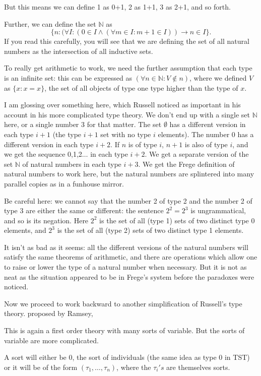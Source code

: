 \documentclass[12pt]{article}
\begin{document}
But this means we can define 1 as 0+1, 2 as 1+1, 3 as 2+1, and so forth.

Further, we can define the set $\mathbb N$ as $$\{n:(\forall I: (0 \in I \wedge (\forall m \in I:m+1 \in I)) \rightarrow n \in I\}.$$  If you read this carefully, you will see that we are defining
the set of all natural numbers as the intersection of all inductive sets.

To really get arithmetic to work, we need the further assumption that each type is an infinite set:  this can be expressed as $(\forall n \in {\mathbb N}:V \not\in  n)$, where we
defined $V$ as $\{x :x=x\}$, the set of all objects of type one type higher than the type of $x$.

I am glossing over something here, which Russell noticed as important in his account in his more complicated type theory.  We don't end up with a single set $\mathbb N$ here,
or a single number 3 for that matter.  The set $\emptyset$ has a different version in each type $i+1$ (the type $i+1$ set with no type $i$ elements).  The number 0 has a different version in each type $i+2$.  If $n$ is of type $i$, $n+1$ is also of type $i$, and we get the sequence 0,1,2$\ldots$ in each type $i+2$.  We get a separate version of the set $\mathbb N$ of natural numbers in each type $i+3$.  We get the Frege definition of natural numbers to work here, but the natural numbers are splintered into many parallel copies as in a funhouse mirror.

Be careful here:  we cannot say that the number 2 of type 2 and the number 2 of type 3 are either the same or different:  the sentence $2^2 = 2^3$ is ungrammatical,
and so is its negation.  Here $2^2$ is the set of all (type 1) sets of two distinct type 0 elements, and $2^3$ is the set of all (type 2) sets of two distinct type 1 elements.

It isn't as bad as it seems:  all the different versions of the natural numbers will satisfy the same theorems of arithmetic, and there are operations which allow one to raise or lower the
type of a natural number when necessary.  But it is not as neat as the situation appeared to be in Frege's system before the paradoxes were noticed.

Now we proceed to work backward to another simplification of Russell's type theory. proposed by Ramsey,

This is again a first order theory with many sorts of variable.  But the sorts of variable are more complicated.

A sort will either be 0, the sort of individuals (the same idea as type 0 in TST) or it will be of the form $(\tau_1,\ldots,\tau_n)$, where the $\tau_i's$ are themselves sorts.
\end{document}
